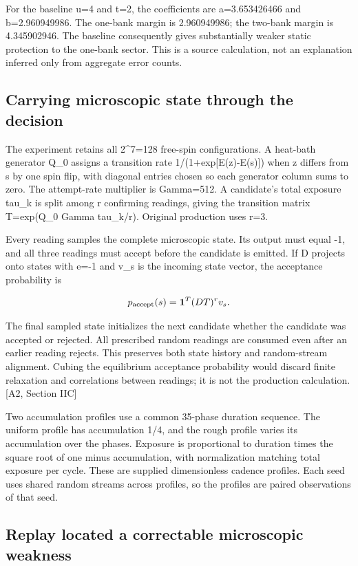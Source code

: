 For the baseline u=4 and t=2, the coefficients are a=3.653426466 and b=2.960949986. The one-bank margin is 2.960949986; the two-bank margin is 4.345902946. The baseline consequently gives substantially weaker static protection to the one-bank sector. This is a source calculation, not an explanation inferred only from aggregate error counts.

\subsection{Carrying microscopic state through the decision}\label{carrying-microscopic-state-through-the-decision}

The experiment retains all 2\^{}7=128 free-spin configurations. A heat-bath generator Q\_0 assigns a transition rate 1/(1+exp{[}E(z)-E(s){]}) when z differs from s by one spin flip, with diagonal entries chosen so each generator column sums to zero. The attempt-rate multiplier is Gamma=512. A candidate's total exposure tau\_k is split among r confirming readings, giving the transition matrix T=exp(Q\_0 Gamma tau\_k/r). Original production uses r=3.

Every reading samples the complete microscopic state. Its output must equal -1, and all three readings must accept before the candidate is emitted. If D projects onto states with e=-1 and v\_s is the incoming state vector, the acceptance probability is

\[p_{\rm accept}(s)=\mathbf1^{T}(DT)^r v_s.\]

The final sampled state initializes the next candidate whether the candidate was accepted or rejected. All prescribed random readings are consumed even after an earlier reading rejects. This preserves both state history and random-stream alignment. Cubing the equilibrium acceptance probability would discard finite relaxation and correlations between readings; it is not the production calculation. {[}A2, Section IIC{]}

Two accumulation profiles use a common 35-phase duration sequence. The uniform profile has accumulation 1/4, and the rough profile varies its accumulation over the phases. Exposure is proportional to duration times the square root of one minus accumulation, with normalization matching total exposure per cycle. These are supplied dimensionless cadence profiles. Each seed uses shared random streams across profiles, so the profiles are paired observations of that seed.

\subsection{Replay located a correctable microscopic weakness}\label{replay-located-a-correctable-microscopic-weakness}

